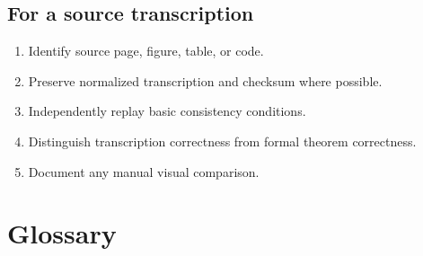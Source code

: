 \documentclass[
  10pt,
  a4paper,
  twoside,
  open=any,
  parskip=half,
  headings=big
]{scrreprt}
\begin{document}
\section{For a source transcription}

\begin{enumerate}
  \item Identify source page, figure, table, or code.
  \item Preserve normalized transcription and checksum where possible.
  \item Independently replay basic consistency conditions.
  \item Distinguish transcription correctness from formal theorem correctness.
  \item Document any manual visual comparison.
\end{enumerate}

\chapter{Glossary}
\label{app:glossary}
\end{document}
